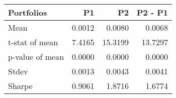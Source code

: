 \begin{tabular}{lrrr}
\toprule
Portfolios & P1 & P2 & P2 - P1 \\
\midrule
Mean & 0.0012 & 0.0080 & 0.0068 \\
t-stat of mean & 7.4165 & 15.3199 & 13.7297 \\
p-value of mean & 0.0000 & 0.0000 & 0.0000 \\
Stdev & 0.0013 & 0.0043 & 0.0041 \\
Sharpe & 0.9061 & 1.8716 & 1.6774 \\
\bottomrule
\end{tabular}
